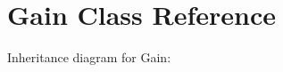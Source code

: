 \hypertarget{classGain}{}\section{Gain Class Reference}
\label{classGain}


Inheritance diagram for Gain\+:
